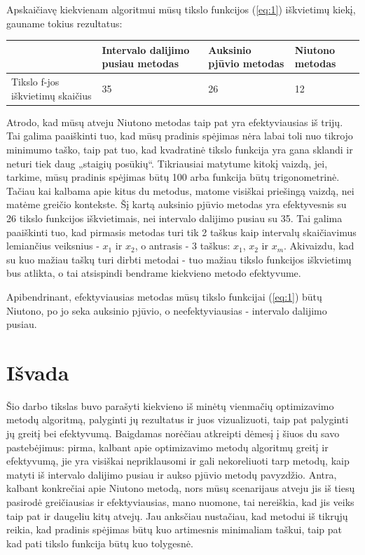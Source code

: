 \documentclass{article}
\begin{document}
Apskaičiavę kiekvienam algoritmui mūsų tikslo funkcijos (\ref{eq:1}) iškvietimų kiekį, gauname tokius rezultatus:
\begin{table}[H]
    \centering
    \begin{tabular}{|p{3cm}|p{3cm}|p{3cm}|p{3cm}|}
    \hline
    \multicolumn{1}{|l|}{} & Intervalo dalijimo pusiau metodas & Auksinio pjūvio metodas & Niutono metodas \\ \hline
                    Tikslo f-jos iškvietimų skaičius & 35 & 26 & 12 \\ \hline
    \end{tabular}
\end{table}

Atrodo, kad mūsų atveju Niutono metodas taip pat yra efektyviausias iš trijų. Tai galima paaiškinti tuo, kad mūsų pradinis spėjimas nėra labai toli nuo tikrojo minimumo taško, taip pat tuo, kad kvadratinė tikslo funkcija yra gana sklandi ir neturi tiek daug „staigių posūkių“. Tikriausiai matytume kitokį vaizdą, jei, tarkime, mūsų pradinis spėjimas būtų 100 arba funkcija būtų trigonometrinė. Tačiau kai kalbama apie kitus du metodus, matome visiškai priešingą vaizdą, nei matėme greičio kontekste. Šį kartą auksinio pjūvio metodas yra efektyvesnis su 26 tikslo funkcijos iškvietimais, nei intervalo dalijimo pusiau su 35. Tai galima paaiškinti tuo, kad pirmasis metodas turi tik 2 taškus kaip intervalų skaičiavimus lemiančius veiksnius - $x_{1}$ ir $x_{2}$, o antrasis - 3 taškus: $x_{1}$, $x_{2}$ ir $x_{m}$. Akivaizdu, kad su kuo mažiau taškų turi dirbti metodai - tuo mažiau tikslo funkcijos iškvietimų bus atlikta, o tai atsispindi bendrame kiekvieno metodo efektyvume.

Apibendrinant, efektyviausias metodas mūsų tikslo funkcijai (\ref{eq:1}) būtų Niutono, po jo seka auksinio pjūvio, o neefektyviausias - intervalo dalijimo pusiau.
\section{Išvada}
Šio darbo tikslas buvo parašyti kiekvieno iš minėtų vienmačių optimizavimo metodų algoritmą, palyginti jų rezultatus ir juos vizualizuoti, taip pat palyginti jų greitį bei efektyvumą. Baigdamas norėčiau atkreipti dėmesį į šiuos du savo pastebėjimus: pirma, kalbant apie optimizavimo metodų algoritmų greitį ir efektyvumą, jie yra visiškai nepriklausomi ir gali nekoreliuoti tarp metodų, kaip matyti iš intervalo dalijimo pusiau ir aukso pjūvio metodų pavyzdžio. Antra, kalbant konkrečiai apie Niutono metodą, nors mūsų scenarijaus atveju jis iš tiesų pasirodė greičiausias ir efektyviausias, mano nuomone, tai nereiškia, kad jis veiks taip pat ir daugeliu kitų atvejų. Jau anksčiau nustačiau, kad metodui iš tikrųjų reikia, kad pradinis spėjimas būtų kuo artimesnis minimaliam taškui, taip pat kad pati tikslo funkcija būtų kuo tolygesnė.
\end{document}
